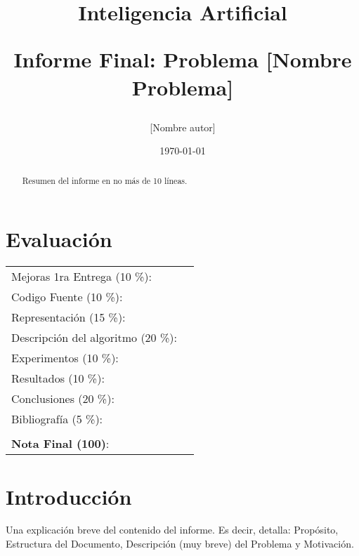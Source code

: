 \documentclass[letter, 10pt]{article}
\begin{document}
\title{Inteligencia Artificial \\ \begin{Large}Informe Final: Problema [Nombre Problema]\end{Large}}
\author{[Nombre autor]}
\date{\today}
\maketitle


\section*{Evaluaci\'on}

\begin{tabular}{ll}
Mejoras 1ra Entrega (10 \%): &  \underline{\hspace{2cm}}\\
Codigo Fuente (10 \%): &  \underline{\hspace{2cm}}\\
Representaci\'on (15 \%):  & \underline{\hspace{2cm}} \\
Descripci\'on del algoritmo (20 \%):  & \underline{\hspace{2cm}} \\
Experimentos (10 \%):  & \underline{\hspace{2cm}} \\
Resultados (10 \%):  & \underline{\hspace{2cm}} \\
Conclusiones (20 \%): &  \underline{\hspace{2cm}}\\
Bibliograf\'ia (5 \%): & \underline{\hspace{2cm}}\\
 &  \\
\textbf{Nota Final (100)}:   & \underline{\hspace{2cm}}
\end{tabular}

\begin{abstract}
Resumen del informe en no m\'as de 10 l\'ineas.
\end{abstract}

\section{Introducci\'on}
Una explicaci\'on breve del contenido del informe. Es decir, detalla: Prop\'osito, Estructura del Documento, Descripci\'on (muy breve) del Problema y Motivaci\'on.
\end{document}
